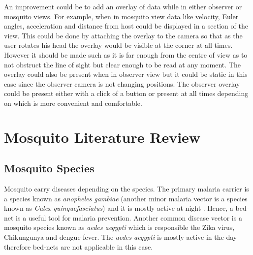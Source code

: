 An improvement could be to add an overlay of data while in either observer or mosquito views. For example, when in mosquito view data like velocity, Euler angles, acceleration and distance from host could be displayed in a section of the view. This could be done by attaching the overlay to the camera so that as the user rotates his head the overlay would be visible at the corner at all times. However it should be made such as it is far enough from the centre of view as to not obstruct the line of sight but clear enough to be read at any moment. The overlay could also be present when in observer view but it could be static in this case since the observer camera is not changing positions. The observer overlay could be present either with a click of a button or present at all times depending on which is more convenient and comfortable.



\section{Mosquito Literature Review}

\subsection{Mosquito Species}

Mosquito carry diseases depending on the species. The primary malaria carrier is a species known as \textit{anopheles gambiae} (another minor malaria vector is a species known as \textit{Culex quinquefasciatus}) and it is mostly active at night . Hence, a bed-net is a useful tool for malaria prevention. Another common disease vector is a mosquito species known as \textit{aedes aegypti} which is responsible the Zika virus, Chikungunya and dengue fever. The \textit{aedes aegypti} is mostly active in the day therefore bed-nets are not applicable in this case.

